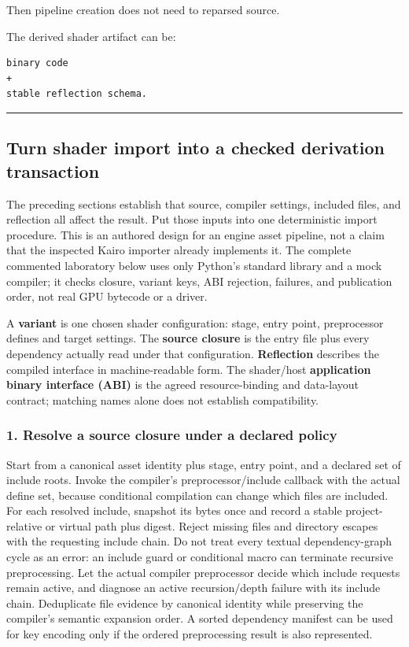 Then pipeline creation does not need to reparsed source.

The derived shader artifact can be:

\begin{verbatim}
binary code
+
stable reflection schema.
\end{verbatim}

\begin{center}\rule{0.5\linewidth}{0.5pt}\end{center}

\subsection{Turn shader import into a checked derivation transaction}\label{05-engine-i-ch010-turn-shader-import-into-a-checked-derivation-transaction}

The preceding sections establish that source, compiler settings, included files, and reflection all affect the result. Put those inputs into one deterministic import procedure. This is an authored design for an engine asset pipeline, not a claim that the inspected Kairo importer already implements it. The complete commented laboratory below uses only Python's standard library and a mock compiler; it checks closure, variant keys, ABI rejection, failures, and publication order, not real GPU bytecode or a driver.

A \textbf{variant} is one chosen shader configuration: stage, entry point, preprocessor defines and target settings. The \textbf{source closure} is the entry file plus every dependency actually read under that configuration. \textbf{Reflection} describes the compiled interface in machine-readable form. The shader/host \textbf{application binary interface (ABI)} is the agreed resource-binding and data-layout contract; matching names alone does not establish compatibility.

\subsubsection{1. Resolve a source closure under a declared policy}\label{05-engine-i-ch010-resolve-a-source-closure-under-a-declared-policy}

Start from a canonical asset identity plus stage, entry point, and a declared set of include roots. Invoke the compiler's preprocessor/include callback with the actual define set, because conditional compilation can change which files are included. For each resolved include, snapshot its bytes once and record a stable project-relative or virtual path plus digest. Reject missing files and directory escapes with the requesting include chain. Do not treat every textual dependency-graph cycle as an error: an include guard or conditional macro can terminate recursive preprocessing. Let the actual compiler preprocessor decide which include requests remain active, and diagnose an active recursion/depth failure with its include chain. Deduplicate file evidence by canonical identity while preserving the compiler's semantic expansion order. A sorted dependency manifest can be used for key encoding only if the ordered preprocessing result is also represented.


